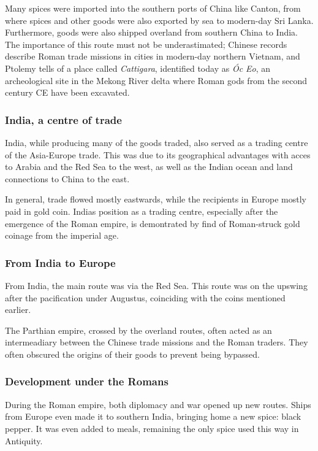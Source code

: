 \documentclass[11pt, a4paper, headings=standardclasses]{scrartcl}
\begin{document}
Many spices were imported into the southern ports of China like Canton, from where spices and other goods were also exported by sea to modern-day Sri Lanka. Furthermore, goods were also shipped overland from southern China to India.\autocite[Maps 4 and 5]{Rome} The importance of this route must not be underastimated; Chinese records describe Roman trade missions in cities in modern-day northern Vietnam\autocite{curtin_1984}, and Ptolemy tells of a place called \emph{Cattigara}, identified today as \emph{\'{O}c Eo}, an archeological site in the Mekong River delta where Roman gods from the second century CE have been excavated.\autocite{OcEo}

\subsubsection{India, a centre of trade}
India, while producing many of the goods traded, also served as a trading centre of the Asia-Europe trade. This was due to its geographical advantages with acces to Arabia and the Red Sea to the west, as well as the Indian ocean and land connections to China to the east.

In general, trade flowed mostly eastwards, while the recipients in Europe mostly paid in gold coin. Indias position as a trading centre, especially after the emergence of the Roman empire, is demontrated by find of Roman-struck gold coinage from the imperial age.\autocite[100]{curtin_1984}\label{gold}

\subsubsection{From India to Europe}

From India, the main route was via the Red Sea. This route was on the upswing after the pacification under Augustus, coinciding with the coins mentioned earlier.\autocite[Chapter 7]{Rome}

The Parthian empire, crossed by the overland routes, often acted as an intermeadiary between the Chinese trade missions and the Roman traders. They often obscured the origins of their goods to prevent being bypassed.\autocite{SilkRome}

\subsubsection{Development under the Romans}

During the Roman empire, both diplomacy and war opened up new routes. Ships from Europe even made it to southern India, bringing home a new spice: black pepper. It was even added to meals, remaining the only spice used this way in Antiquity.\autocite{RIS}
\end{document}
